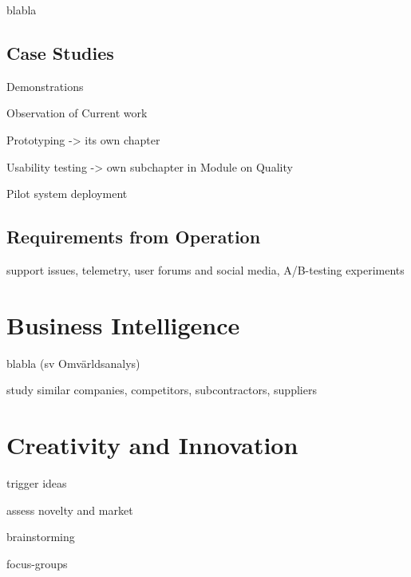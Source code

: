 blabla

\subsection{Case Studies}

Demonstrations

Observation of Current work 

Prototyping -> its own chapter 

Usability testing -> own subchapter in Module on Quality

Pilot system deployment

\subsection{Requirements from Operation}

support issues, telemetry, user forums and social media, A/B-testing experiments


\section{Business Intelligence}
blabla  (sv Omvärldsanalys)

study similar companies, competitors, subcontractors, suppliers 

\section{Creativity and Innovation}

trigger ideas 

assess novelty and market 

brainstorming

focus-groups
